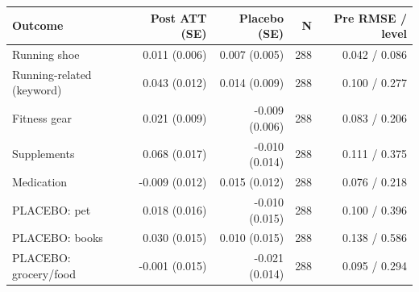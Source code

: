 \begin{tabular}{lrrrr}
\toprule
Outcome & Post ATT (SE) & Placebo (SE) & N & Pre RMSE / level \\
\midrule
Running shoe & 0.011 (0.006) & 0.007 (0.005) & 288 & 0.042 / 0.086 \\
Running-related (keyword) & 0.043 (0.012) & 0.014 (0.009) & 288 & 0.100 / 0.277 \\
Fitness gear & 0.021 (0.009) & -0.009 (0.006) & 288 & 0.083 / 0.206 \\
Supplements & 0.068 (0.017) & -0.010 (0.014) & 288 & 0.111 / 0.375 \\
Medication & -0.009 (0.012) & 0.015 (0.012) & 288 & 0.076 / 0.218 \\
PLACEBO: pet & 0.018 (0.016) & -0.010 (0.015) & 288 & 0.100 / 0.396 \\
PLACEBO: books & 0.030 (0.015) & 0.010 (0.015) & 288 & 0.138 / 0.586 \\
PLACEBO: grocery/food & -0.001 (0.015) & -0.021 (0.014) & 288 & 0.095 / 0.294 \\
\bottomrule
\end{tabular}
